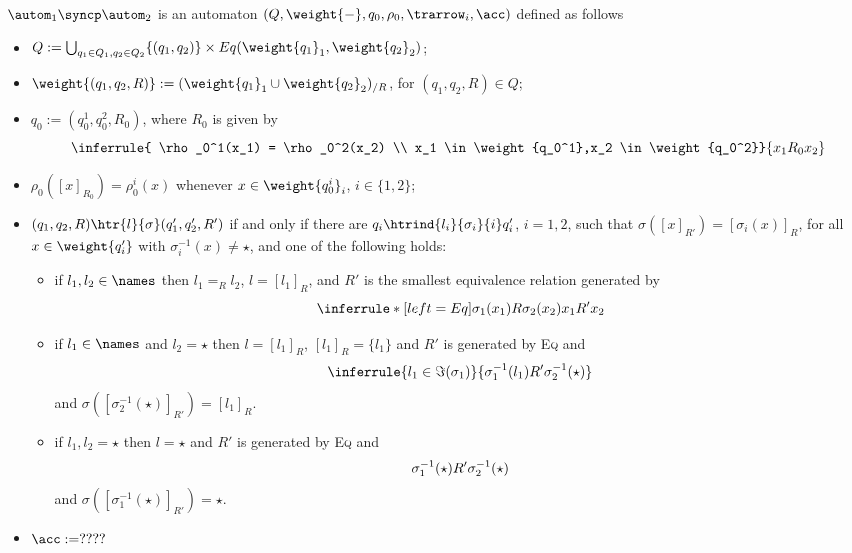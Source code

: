 \begin{definition}
\label{def:syncp}
 $\autom_1 \syncp \autom_2$ is an automaton $(Q,\weight{-},q_0,\rho_0,\trarrow_i,\acc)$ defined as follows
\begin{itemize}
	\item $Q := \bigcup_{q_1 \in Q_1,q_2 \in Q_2} \{(q_1,q_2)\} \times Eq(\weight{q_1}_1,\weight{q_2}_2)$;
	\item $\weight{(q_1,q_2,R)} := (\weight{q_1}_1 \cup \weight{q_2}_2)_{/R}$, for $(q_1,q_2,R) \in Q$;
	\item $q_0 := (q_0^1,q_0^2,R_0)$, where $R_0$ is given by
	\[
		\inferrule
		{ \rho_0^1(x_1) = \rho_0^2(x_2) \\ x_1 \in \weight{q_0^1},x_2 \in \weight{q_0^2}}
		{ x_1 \eq{R_0} x_2 }
	\]
	\item $\rho_0([x]_{R_0}) = \rho_0^i (x)$ whenever $x \in \weight{q_0^i}_i$, $i \in \{1,2\}$; 
	\item $(q_1,q_2,R) \htr{l}{\sigma} (q_1',q_2',R')$ if and only if there are $q_i \htrind{l_i}{\sigma_i}{i} q_i'$, $i=1,2$, such that $\sigma([x]_{R'}) = [\sigma_i(x)]_R$, for all $x \in \weight{q_i'}$ with $\sigma_i^{-1}(x) \neq \star$, 
	and one of the following holds: 
	\begin{itemize}
		\item if $l_1,l_2 \in \names$ then $l_1 =_R l_2$, $l = [l_1]_R$, and $R'$ is the smallest equivalence relation generated by
		\[
			\inferrule*[left=Eq]
			{ \sigma_1(x_1) \eq{R} \sigma_2(x_2) }
			{ x_1 \eq{R'} x_2 }
		\]
		\item if $l_1 \in \names$ and $l_2 = \star $ then $l = [l_1]_R$, $[l_1]_R = \{l_1\}$ and $R'$ is generated by \textsc{Eq} and
		\[
			\inferrule
			{ l_1 \in \Im(\sigma_1) }
			{ \sigma_1^{-1}(l_1) \eq{R'} \sigma_2^{-1}(\star) }
		\]
		and $\sigma([\sigma_2^{-1}(\star)]_{R'}) = [l_1]_R$.
		\item if $l_1,l_2 = \star$ then $l=\star$ and $R'$ is generated by \textsc{Eq} and
		\[
			\sigma_1^{-1}(\star) R' \sigma_2^{-1}(\star)
		\]
		and $\sigma([\sigma_1^{-1}(\star)]_{R'}) = \star$.
	\end{itemize}
	\item $\acc := ????$
\end{itemize}
\end{definition}

